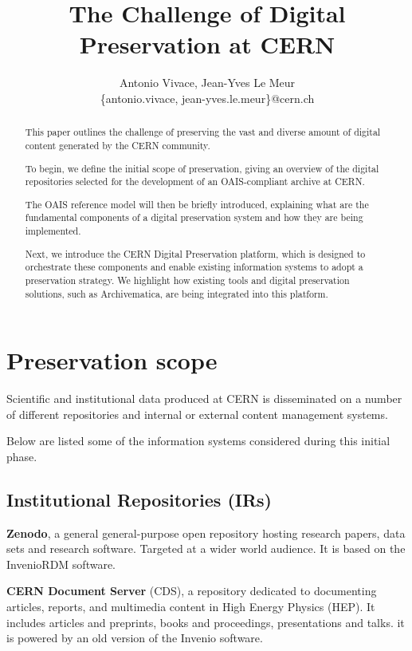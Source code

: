 \documentclass[11pt]{IEEEtran}
\title{ The Challenge of Digital Preservation at CERN }
\author{Antonio Vivace, Jean-Yves Le Meur\\
    \{antonio.vivace, jean-yves.le.meur\}@cern.ch}
\begin{document}
\maketitle

\begin{abstract}
This paper outlines the challenge of preserving the vast and diverse amount of digital content generated by the CERN community.

To begin, we define the initial scope of preservation, giving an overview of the digital repositories selected for the development of an OAIS-compliant archive at CERN.

The OAIS reference model will then be briefly introduced, explaining what are the fundamental components of a digital preservation system and how they are being  implemented.

Next, we introduce the CERN Digital Preservation platform, which is designed to orchestrate these components and enable existing information systems to adopt a preservation strategy. We highlight how existing tools and digital preservation solutions, such as Archivematica, are being integrated into this platform.

\end{abstract}

\section{Preservation scope}

Scientific and institutional data produced at CERN is disseminated on a number of different repositories and internal or external content management systems.

Below are listed some of the information systems considered during this initial phase.

\subsection{Institutional Repositories (IRs)} 

\textbf{Zenodo}, a general general-purpose open repository hosting research papers, data sets and research software. Targeted at a wider world audience. It is based on the InvenioRDM \cite{InvenioRDMinveniosoftwareorg-2023-03-16} software.

\textbf{CERN Document Server} (CDS), a repository dedicated to documenting articles, reports, and multimedia content in High Energy Physics (HEP). It includes articles and preprints, books and proceedings, presentations and talks. it is powered by an old version of the Invenio software.
\end{document}
